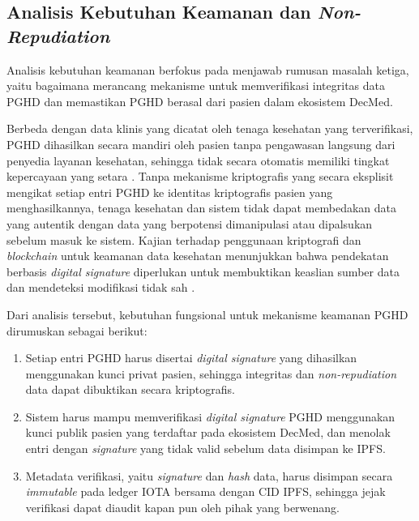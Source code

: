 \subsection{Analisis Kebutuhan Keamanan dan \textit{Non-Repudiation}}\label{analisis-kebutuhan-keamanan}

Analisis kebutuhan keamanan berfokus pada menjawab rumusan masalah ketiga, yaitu bagaimana merancang mekanisme untuk memverifikasi integritas data PGHD dan memastikan PGHD berasal dari pasien dalam ekosistem DecMed.

Berbeda dengan data klinis yang dicatat oleh tenaga kesehatan yang terverifikasi, PGHD dihasilkan secara mandiri oleh pasien tanpa pengawasan langsung dari penyedia layanan kesehatan, sehingga tidak secara otomatis memiliki tingkat kepercayaan yang setara \parencite{Abdolkhani_2019_PGHD_Quality_Challenges}. 
Tanpa mekanisme kriptografis yang secara eksplisit mengikat setiap entri PGHD ke identitas kriptografis pasien yang menghasilkannya, tenaga kesehatan dan sistem tidak dapat membedakan data yang autentik dengan data yang berpotensi dimanipulasi atau dipalsukan sebelum masuk ke sistem. 
Kajian terhadap penggunaan kriptografi dan \textit{blockchain} untuk keamanan data kesehatan menunjukkan bahwa pendekatan berbasis \textit{digital signature} diperlukan untuk membuktikan keaslian sumber data dan mendeteksi modifikasi tidak sah \parencite{Ahmed_2023_Data_Provenance,Khatiwada_Yang_Lin_Blobel_2024_PGHD_Understanding}.

Dari analisis tersebut, kebutuhan fungsional untuk mekanisme keamanan PGHD 
dirumuskan sebagai berikut:
\begin{enumerate}
    \item[\textbf{S1}] Setiap entri PGHD harus disertai \textit{digital signature} 
    yang dihasilkan menggunakan kunci privat pasien, sehingga integritas dan 
    \textit{non-repudiation} data dapat dibuktikan secara kriptografis.
    \item[\textbf{S2}] Sistem harus mampu memverifikasi \textit{digital signature} 
    PGHD menggunakan kunci publik pasien yang terdaftar pada ekosistem DecMed, 
    dan menolak entri dengan \textit{signature} yang tidak valid sebelum data 
    disimpan ke IPFS.
    \item[\textbf{S3}] Metadata verifikasi, yaitu \textit{signature} dan 
    \textit{hash} data, harus disimpan secara \textit{immutable} pada ledger 
    IOTA bersama dengan CID IPFS, sehingga jejak verifikasi dapat diaudit 
    kapan pun oleh pihak yang berwenang.
\end{enumerate}
